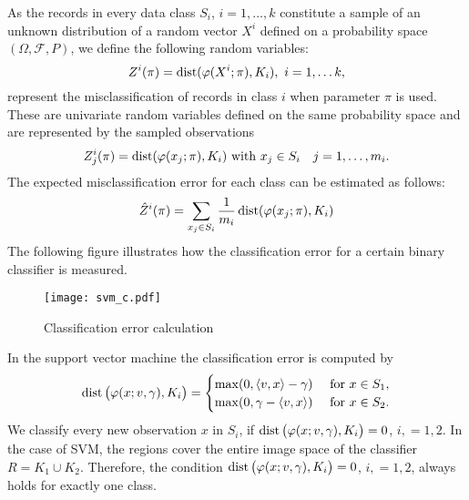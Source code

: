 \documentclass[10pt,letterpaper]{article}
\newcommand{\Fc}{\mathcal{F}}
\newcommand{\1}{1{\hskip -2.55 pt}\hbox{I}}
\newcommand{\dist}{\mathop{\rm dist}}
\begin{document}
As the records in every data class $S_i$, $i=1,\dots, k$ constitute a sample of an unknown distribution of a random vector $X^i$ defined on a probability space $(\varOmega,\Fc,P)$, we define the following random variables:
\begin{equation}
\label{d:error}
Z^i(\pi)=\dist(\varphi(X^i;\pi),{K_i}),\,\, i=1,\dots k,
\end{equation}
represent the misclassification of records in class $i$ when parameter $\pi$ is used. 
These are univariate random variables defined on the same probability space and are represented by the sampled observations
\[
Z^i_j(\pi)=\dist(\varphi(x_j;\pi),{K_i}) \text{ with } x_j\in S_i\quad j=1,\dots, m_i.
\]
The expected misclassification error for each class can be estimated as follows:
\[
\hat{Z}^i (\pi) = \sum_{x_j\in S_i} \frac{1}{m_i}\dist(\varphi(x_j;\pi),K_i)
\]
The following figure illustrates how the classification error for a certain binary classifier is measured.
\begin{figure}[!h]
\begin{center}
\vspace{-2cm}
\texttt{[image: svm\_c.pdf]}
\label{fig:error_dist}
\vspace{-2cm}
\caption{Classification error calculation}
\end{center}
\end{figure}
In the support vector machine the classification error is computed by 
\[
\dist \big(\varphi(x;v,\gamma), K_i\big)= \begin{cases} \max(0, \langle v, x \rangle -\gamma) & \text{ for } x\in S_1,\\
\max(0, \gamma-\langle v, x\rangle) & \text{ for } x\in S_2.
\end{cases}
\]
We classify every new observation $x$ in $S_i$, if $\dist \big(\varphi(x;v,\gamma), K_i\big) =0$, $i,=1,2$. 
In the case of SVM, the regions cover the entire image space of the classifier $R=K_1\cup K_2.$ Therefore, the condition
$\dist \big(\varphi(x;v,\gamma), K_i\big) =0$, $i,=1,2$,  always holds for exactly one class.
\end{document}
